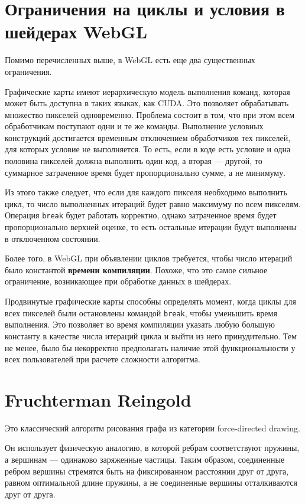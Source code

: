 \section{Ограничения на циклы и условия в шейдерах WebGL}

Помимо перечисленных выше, в WebGL есть еще два существенных ограничения.

Графические карты имеют иерархическую модель выполнения команд, которая может быть доступна в таких языках, как CUDA. Это позволяет обрабатывать множество пикселей одновременно. Проблема состоит в том, что при этом всем обработчикам поступают одни и те же команды. Выполнение условных конструкций достигается временным отключением обработчиков тех пикселей, для которых условие не выполняется. То есть, если в коде есть условие и одна половина пикселей должна выполнить один код, а вторая --- другой, то суммарное затраченное время будет пропорционально сумме, а не минимуму.

Из этого также следует, что если для каждого пикселя необходимо выполнить цикл, то число выполненных итераций будет равно максимуму по всем пикселям. Операция \texttt{break} будет работать корректно, однако затраченное время будет пропорционально верхней оценке, то есть остальные итерации будут выполнены в отключенном состоянии.

Более того, в WebGL при объявлении циклов требуется, чтобы число итераций было константой {\bfseries времени компиляции}. Похоже, что это самое сильное ограничение, возникающее при обработке данных в шейдерах.

Продвинутые графические карты способны определять момент, когда циклы для всех пикселей были остановлены командой \texttt{break}, чтобы уменьшить время выполнения. Это позволяет во время компиляции указать любую большую константу в качестве числа итераций цикла и выйти из него принудительно. Тем не менее, было бы некорректно предполагать наличие этой функциональности у всех пользователей при расчете сложности алгоритма.

\section{Fruchterman Reingold}

Это классический алгоритм рисования графа из категории force-directed drawing.

Он использует физическую аналогию, в которой ребрам соответствуют пружины, а вершинам --- одинаково заряженные частицы. Таким образом, соединенные ребром вершины стремятся быть на фиксированном расстоянии друг от друга, равном оптимальной длине пружины, а не соединенные вершины отталкиваются друг от друга.

